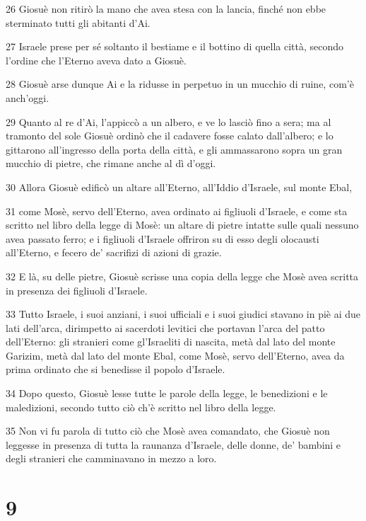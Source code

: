 \par 26 Giosuè non ritirò la mano che avea stesa con la lancia, finché non ebbe sterminato tutti gli abitanti d'Ai.
\par 27 Israele prese per sé soltanto il bestiame e il bottino di quella città, secondo l'ordine che l'Eterno aveva dato a Giosuè.
\par 28 Giosuè arse dunque Ai e la ridusse in perpetuo in un mucchio di ruine, com'è anch'oggi.
\par 29 Quanto al re d'Ai, l'appiccò a un albero, e ve lo lasciò fino a sera; ma al tramonto del sole Giosuè ordinò che il cadavere fosse calato dall'albero; e lo gittarono all'ingresso della porta della città, e gli ammassarono sopra un gran mucchio di pietre, che rimane anche al dì d'oggi.
\par 30 Allora Giosuè edificò un altare all'Eterno, all'Iddio d'Israele, sul monte Ebal,
\par 31 come Mosè, servo dell'Eterno, avea ordinato ai figliuoli d'Israele, e come sta scritto nel libro della legge di Mosè: un altare di pietre intatte sulle quali nessuno avea passato ferro; e i figliuoli d'Israele offriron su di esso degli olocausti all'Eterno, e fecero de' sacrifizi di azioni di grazie.
\par 32 E là, su delle pietre, Giosuè scrisse una copia della legge che Mosè avea scritta in presenza dei figliuoli d'Israele.
\par 33 Tutto Israele, i suoi anziani, i suoi ufficiali e i suoi giudici stavano in piè ai due lati dell'arca, dirimpetto ai sacerdoti levitici che portavan l'arca del patto dell'Eterno: gli stranieri come gl'Israeliti di nascita, metà dal lato del monte Garizim, metà dal lato del monte Ebal, come Mosè, servo dell'Eterno, avea da prima ordinato che si benedisse il popolo d'Israele.
\par 34 Dopo questo, Giosuè lesse tutte le parole della legge, le benedizioni e le maledizioni, secondo tutto ciò ch'è scritto nel libro della legge.
\par 35 Non vi fu parola di tutto ciò che Mosè avea comandato, che Giosuè non leggesse in presenza di tutta la raunanza d'Israele, delle donne, de' bambini e degli stranieri che camminavano in mezzo a loro.

\chapter{9}

